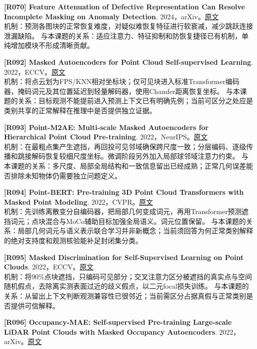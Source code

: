 \documentclass[11pt,a4paper]{article}
\begin{document}
\hypertarget{R070}{}\textbf{[R070] Feature Attenuation of Defective Representation Can Resolve Incomplete Masking on Anomaly Detection}. 2024，arXiv。\href{https://arxiv.org/pdf/2407.04597}{原文}\\
机制：预测各图块的正常恢复难度，对疑似难恢复特征进行软衰减，减少跳跃连接泄漏缺陷。 与本课题的关系：适应注意力、特征抑制和防恢复捷径已有机制，单纯增加模块不形成清晰贡献。\par\medskip
\hypertarget{R092}{}\textbf{[R092] Masked Autoencoders for Point Cloud Self-supervised Learning}. 2022，ECCV。\href{https://arxiv.org/pdf/2203.06604}{原文}\\
机制：将点云划为FPS/KNN相对坐标块；仅可见块进入标准Transformer编码器，掩码词元及其位置延迟到轻量解码器，使用Chamfer距离恢复坐标。 与本课题的关系：目标观测不能提前进入预测上下文已有明确先例；当前可区分之处应是类别共享的正常解释在推理中是否提供独立证据。\par\medskip
\hypertarget{R093}{}\textbf{[R093] Point-M2AE: Multi-scale Masked Autoencoders for Hierarchical Point Cloud Pre-training}. 2022，NeurIPS。\href{https://arxiv.org/pdf/2205.14401}{原文}\\
机制：在最粗点集产生遮挡，再回投可见邻域确保跨尺度一致；分层编码、逐级传播和跳接解码恢复较细尺度坐标。微调阶段另外加入局部球邻域注意力约束。 与本课题的关系：多尺度、局部全局结构和一致信息留出已经成熟；正常几何误差能否排除未知物体仍需要独立问题定义。\par\medskip
\hypertarget{R094}{}\textbf{[R094] Point-BERT: Pre-training 3D Point Cloud Transformers with Masked Point Modeling}. 2022，CVPR。\href{https://arxiv.org/pdf/2111.14819}{原文}\\
机制：先训练离散变分自编码器，把局部几何变成词元，再用Transformer预测遮挡词元；点块混合与MoCo辅助目标加强全局语义。词元位置保留。 与本课题的关系：局部几何词元与语义表示联合学习并非新概念；当前须回答为何正常类别解释的绝对支持度和观测核验能补足封闭集分类。\par\medskip
\hypertarget{R095}{}\textbf{[R095] Masked Discrimination for Self-Supervised Learning on Point Clouds}. 2022，ECCV。\href{https://arxiv.org/pdf/2203.11183}{原文}\\
机制：将90\%点块遮挡，只编码可见部分；交叉注意力区分被遮挡的真实点与空间随机假点，去除离实测表面过近的歧义假点，以二元focal损失训练。 与本课题的关系：从留出上下文判断观测兼容性已很邻近；当前需区分占据真假与正常类别是否提供可信解释。\par\medskip
\hypertarget{R096}{}\textbf{[R096] Occupancy-MAE: Self-supervised Pre-training Large-scale LiDAR Point Clouds with Masked Occupancy Autoencoders}. 2022，arXiv。\href{https://arxiv.org/pdf/2206.09900}{原文}\\
\end{document}
